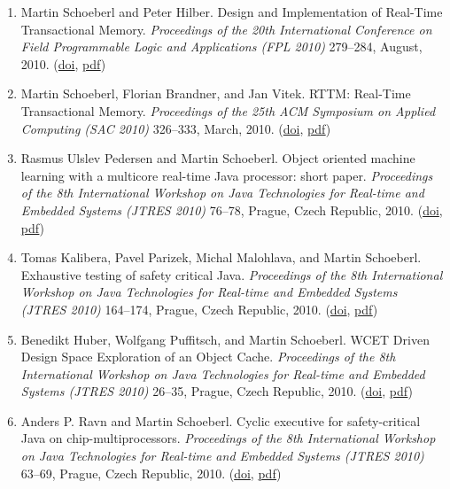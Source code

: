 \begin{enumerate}
\item Martin Schoeberl and Peter Hilber.
 Design and Implementation of Real-Time Transactional Memory.
 \emph{Proceedings of the 20th International Conference on Field Programmable Logic and Applications (FPL 2010)} 279--284, August, 2010.
(\href{http://dx.doi.org/10.1109/FPL.2010.64}{doi}, \href{http://www.jopdesign.com/doc/rttmimpl.pdf}{pdf})

\item Martin Schoeberl, Florian Brandner, and Jan Vitek.
 RTTM: Real-Time Transactional Memory.
 \emph{Proceedings of the 25th ACM Symposium on Applied Computing (SAC 2010)} 326--333, March, 2010.
(\href{http://dx.doi.org/10.1145/1774088.1774158}{doi}, \href{http://www.jopdesign.com/doc/rttm.pdf}{pdf})

\item Rasmus Ulslev Pedersen and Martin Schoeberl.
 Object oriented machine learning with a multicore real-time Java processor: short paper.
 \emph{Proceedings of the 8th International Workshop on Java Technologies for Real-time and Embedded Systems (JTRES 2010)} 76--78, Prague, Czech Republic, 2010.
(\href{http://dx.doi.org/10.1145/1850771.1850782}{doi}, \href{http://www.jopdesign.com/doc/jopmulticoresvm_short.pdf}{pdf})

\item Tomas Kalibera, Pavel Parizek, Michal Malohlava, and Martin Schoeberl.
 Exhaustive testing of safety critical Java.
 \emph{Proceedings of the 8th International Workshop on Java Technologies for Real-time and Embedded Systems (JTRES 2010)} 164--174, Prague, Czech Republic, 2010.
(\href{http://dx.doi.org/10.1145/1850771.1850794}{doi}, \href{http://www.jopdesign.com/doc/jpfscj.pdf}{pdf})

\item Benedikt Huber, Wolfgang Puffitsch, and Martin Schoeberl.
 WCET Driven Design Space Exploration of an Object Cache.
 \emph{Proceedings of the 8th International Workshop on Java Technologies for Real-time and Embedded Systems (JTRES 2010)} 26--35, Prague, Czech Republic, 2010.
(\href{http://dx.doi.org/10.1145/1850771.1850775}{doi}, \href{http://www.jopdesign.com/doc/ocwcet.pdf}{pdf})

\item Anders P. Ravn and Martin Schoeberl.
 Cyclic executive for safety-critical Java on chip-multiprocessors.
 \emph{Proceedings of the 8th International Workshop on Java Technologies for Real-time and Embedded Systems (JTRES 2010)} 63--69, Prague, Czech Republic, 2010.
(\href{http://dx.doi.org/10.1145/1850771.1850779}{doi}, \href{http://www.jopdesign.com/doc/cmpce.pdf}{pdf})


\end{enumerate}
